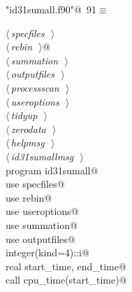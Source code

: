 \documentclass[10pt,a4paper,notitlepage]{article}
\begin{document}
\begin{flushleft} \small
\begin{minipage}{\linewidth}\label{scrap114}\raggedright\small
{} \verb@"id31sumall.f90"@\nobreak\ {\footnotesize {91}}$\equiv$
\vspace{-1ex}
\begin{list}{}{} \item
\mbox{}\verb@@\hbox{$\langle\,${\it specfiles}\nobreak\ {\footnotesize {}}$\,\rangle$}\verb@@\\
\mbox{}\verb@@\hbox{$\langle\,${\it rebin}\nobreak\ {\footnotesize {}}$\,\rangle$}\verb@ @\\
\mbox{}\verb@@\hbox{$\langle\,${\it summation}\nobreak\ {\footnotesize {}}$\,\rangle$}\verb@@\\
\mbox{}\verb@@\hbox{$\langle\,${\it outputfiles}\nobreak\ {\footnotesize {}}$\,\rangle$}\verb@@\\
\mbox{}\verb@@\hbox{$\langle\,${\it processscan}\nobreak\ {\footnotesize {}}$\,\rangle$}\verb@@\\
\mbox{}\verb@@\hbox{$\langle\,${\it useroptions}\nobreak\ {\footnotesize {}}$\,\rangle$}\verb@@\\
\mbox{}\verb@@\hbox{$\langle\,${\it tidyup}\nobreak\ {\footnotesize {}}$\,\rangle$}\verb@@\\
\mbox{}\verb@@\hbox{$\langle\,${\it zerodata}\nobreak\ {\footnotesize {}}$\,\rangle$}\verb@@\\
\mbox{}\verb@@\hbox{$\langle\,${\it helpmsg}\nobreak\ {\footnotesize {}}$\,\rangle$}\verb@@\\
\mbox{}\verb@@\hbox{$\langle\,${\it id31sumallmsg}\nobreak\ {\footnotesize {}}$\,\rangle$}\verb@@\\
\mbox{}\verb@      program id31sumall@\\
\mbox{}\verb@      use specfiles@\\
\mbox{}\verb@      use rebin@\\
\mbox{}\verb@      use useroptions@\\
\mbox{}\verb@      use summation@\\
\mbox{}\verb@      use outputfiles@\\
\mbox{}\verb@      integer(kind=4)::i@\\
\mbox{}\verb@      real start_time, end_time@\\
\mbox{}\verb@      call cpu_time(start_time)@\\

\end{list}
\end{minipage}
\end{flushleft}
\end{document}
